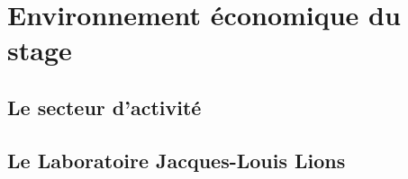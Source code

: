 
\chapter{Environnement économique du stage} %

\label{Chapter2} %


\section{Le secteur d'activité}


\section{Le Laboratoire Jacques-Louis Lions}